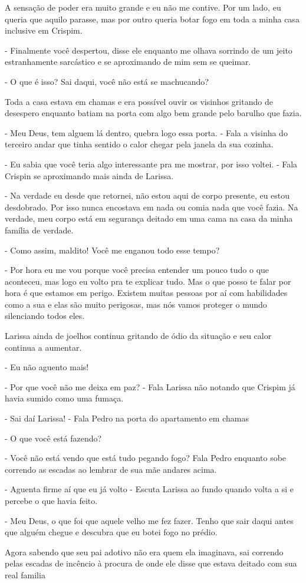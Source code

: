 A sensação de poder era muito grande e eu não me contive. Por um lado, eu queria que aquilo parasse, mas por outro queria botar fogo em toda a minha casa inclusive em Crispim.

- Finalmente você despertou, disse ele enquanto me olhava sorrindo de um jeito estranhamente sarcástico e se aproximando de mim sem se queimar.

- O que é isso? Sai daqui, você não está se machucando?

Toda a casa estava em chamas e era possível ouvir os visinhos gritando de desespero enquanto batiam na porta com algo bem grande pelo barulho que fazia.

- Meu Deus, tem alguem lá dentro, quebra logo essa porta. - Fala a visinha do terceiro andar que tinha sentido o calor chegar pela janela da sua cozinha.

- Eu sabia que você teria algo interessante pra me mostrar, por isso voltei. - Fala Crispin se aproximando mais ainda de Larissa.

- Na verdade eu desde que retornei, não estou aqui de corpo presente, eu estou desdobrado. Por isso nunca encostava em nada ou comia nada que você fazia. Na verdade, meu corpo está em segurança deitado em uma cama na casa da minha família de verdade.

- Como assim, maldito! Você me enganou todo esse tempo?

- Por hora eu me vou porque você precisa entender um pouco tudo o que aconteceu, mas logo eu volto pra te explicar tudo. Mas o que posso te falar por hora é que estamos em perigo. Existem muitas pessoas por aí com habilidades como a sua e elas são muito perigosas, mas nós vamos proteger o mundo silenciando todos eles.

Larissa ainda de joelhos continua gritando de ódio da situação e seu calor continua a aumentar.

- Eu não aguento mais!

- Por que você não me deixa em paz? - Fala Larissa não notando que Crispim já havia sumido como uma fumaça.

- Sai daí Larissa! - Fala Pedro na porta do apartamento em chamas

- O que você está fazendo?

- Você não está vendo que está tudo pegando fogo? Fala Pedro enquanto sobe correndo as escadas ao lembrar de sua mãe andares acima.

- Aguenta firme aí que eu já volto - Escuta Larissa ao fundo quando volta a si e percebe o que havia feito.

- Meu Deus, o que foi que aquele velho me fez fazer. Tenho que sair daqui antes que alguém chegue e descubra que eu botei fogo no prédio.

Agora sabendo que seu pai adotivo não era quem ela imaginava, sai correndo pelas escadas de incêncio à procura de onde ele disse que estava deitado com sua real familia



